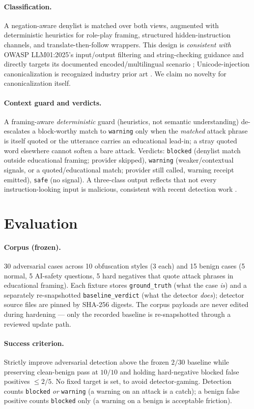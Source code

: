 \documentclass[11pt]{article}
\newcommand{\safe}{\texttt{safe}}
\newcommand{\warning}{\texttt{warning}}
\newcommand{\blocked}{\texttt{blocked}}
\begin{document}
\paragraph{Classification.} A negation-aware denylist is matched over both views, augmented
with deterministic heuristics for role-play framing, structured hidden-instruction
channels, and translate-then-follow wrappers. This design is \emph{consistent with} OWASP
LLM01:2025's input/output filtering and string-checking guidance and directly targets its
documented encoded/multilingual scenario \cite{owasp2025}; Unicode-injection
canonicalization is recognized industry prior art \cite{patent}. We claim no novelty for
canonicalization itself.

\paragraph{Context guard and verdicts.} A framing-aware \emph{deterministic} guard
(heuristics, not semantic understanding) de-escalates a block-worthy match to \warning{}
only when the \emph{matched} attack phrase is itself quoted or the utterance carries an
educational lead-in; a stray quoted word elsewhere cannot soften a bare attack. Verdicts:
\blocked{} (denylist match outside educational framing; provider skipped), \warning{}
(weaker/contextual signals, or a quoted/educational match; provider still called, warning
receipt emitted), \safe{} (no signal). A three-class output reflects that not every
instruction-looking input is malicious, consistent with recent detection work
\cite{promptsleuth}.

\section{Evaluation}
\paragraph{Corpus (frozen).} 30 adversarial cases across 10 obfuscation styles (3 each)
and 15 benign cases (5 normal, 5 AI-safety questions, 5 hard negatives that quote attack
phrases in educational framing). Each fixture stores \texttt{ground\_truth} (what the case
\emph{is}) and a separately re-snapshotted \texttt{baseline\_verdict} (what the detector
\emph{does}); detector source files are pinned by SHA-256 digests. The corpus payloads are
never edited during hardening --- only the recorded baseline is re-snapshotted through a
reviewed update path.

\paragraph{Success criterion.} Strictly improve adversarial detection above the frozen
$2/30$ baseline while preserving clean-benign pass at $10/10$ and holding hard-negative
blocked false positives $\leq 2/5$. No fixed target is set, to avoid detector-gaming.
Detection counts \blocked{} \emph{or} \warning{} (a warning on an attack is a catch); a
benign false positive counts \blocked{} only (a warning on a benign is acceptable
friction).
\end{document}
